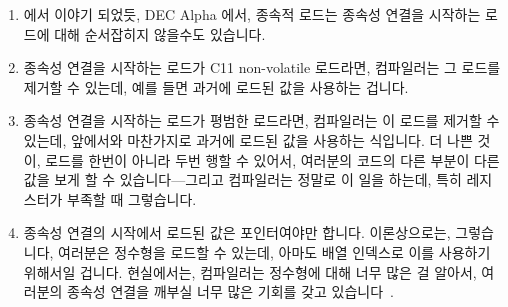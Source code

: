 \begin{enumerate}
\item	{} 에서 이야기 되었듯, DEC Alpha 에서, 종속적
	로드는 종속성 연결을 시작하는 로드에 대해 순서잡히지 않을수도 있습니다.
\item	종속성 연결을 시작하는 로드가 C11 non-volatile
	 로드라면, 컴파일러는 그 로드를 제거할 수
	있는데, 예를 들면 과거에 로드된 값을 사용하는 겁니다.
\item	종속성 연결을 시작하는 로드가 평범한 로드라면, 컴파일러는 이 로드를
	제거할 수 있는데, 앞에서와 마찬가지로 과거에 로드된 값을 사용하는
	식입니다.
	더 나쁜 것이, 로드를 한번이 아니라 두번 행할 수 있어서, 여러분의 코드의
	다른 부분이 다른 값을 보게 할 수 있습니다---그리고 컴파일러는 정말로 이
	일을 하는데, 특히 레지스터가 부족할 때 그렇습니다.
\item	종속성 연결의 시작에서 로드된 값은 포인터여야만 합니다.
	이론상으로는, 그렇습니다, 여러분은 정수형을 로드할 수 있는데, 아마도
	배열 인덱스로 이를 사용하기 위해서일 겁니다.
	현실에서는, 컴파일러는 정수형에 대해 너무 많은 걸 알아서, 여러분의
	종속성 연결을 깨부실 너무 많은 기회를 갖고
	있습니다~\cite{PaulEMcKennneyConsumeP0190R4}.

\end{enumerate}

